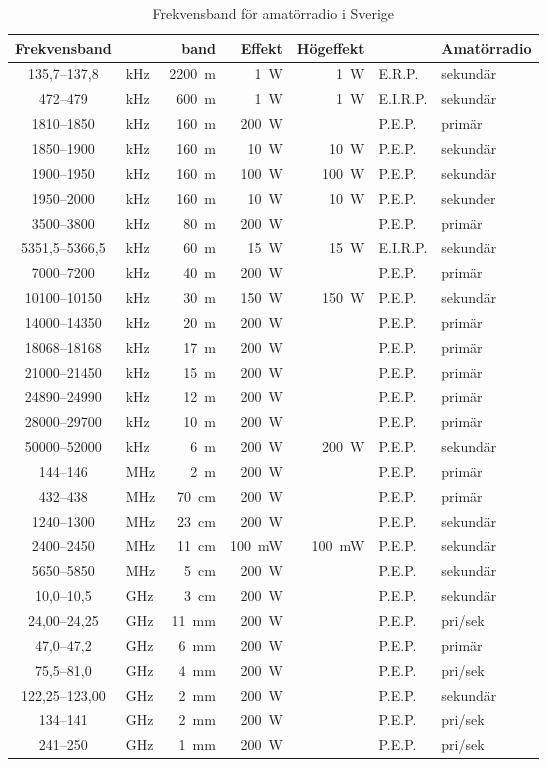 \begin{table*}[b!]
  \centering
\caption{Frekvensband för amatörradio i Sverige}
\label{frekvensplan}
\begin{tabular}{clr|rrl|l}
Frekvensband &  & band & Effekt & Högeffekt & & Amatörradio\\ \hline
135,7--137,8 & kHz & 2200~m & 1~W & 1~W & E.R.P. & sekundär\\
472--479 & kHz & 600~m & 1~W & 1~W & E.I.R.P. & sekundär\\
1810--1850 & kHz & 160~m & 200~W & & P.E.P. & primär\\
1850--1900 & kHz & 160~m & 10~W & 10~W & P.E.P. & sekundär\\
1900--1950 & kHz & 160~m & 100~W & 100~W & P.E.P. & sekundär\\
1950--2000 & kHz & 160~m & 10~W & 10~W & P.E.P. & sekunder\\
3500--3800 & kHz & 80~m  & 200~W & & P.E.P. & primär\\
5351,5--5366,5 & kHz & 60~m & 15~W & 15~W & E.I.R.P. & sekundär\\
7000--7200 & kHz & 40~m  & 200~W & & P.E.P. & primär\\
10100--10150 & kHz & 30~m & 150~W & 150~W & P.E.P. & sekundär\\
14000--14350 & kHz & 20~m & 200~W & & P.E.P. & primär\\
18068--18168 & kHz & 17~m & 200~W & & P.E.P. & primär\\
21000--21450 & kHz & 15~m & 200~W & & P.E.P. & primär\\
24890--24990 & kHz & 12~m & 200~W & & P.E.P. & primär\\
28000--29700 & kHz & 10~m & 200~W & & P.E.P. & primär\\
50000--52000 & kHz & 6~m & 200~W & 200~W & P.E.P. & sekundär\\ \hline
144--146 & MHz & 2~m & 200~W & & P.E.P. & primär\\
432--438 & MHz & 70~cm & 200~W & & P.E.P. & primär\\
1240--1300 & MHz & 23~cm & 200~W & & P.E.P. & sekundär\\
2400--2450 & MHz & 11~cm & 100~mW & 100~mW & P.E.P. & sekundär\\
5650--5850 & MHz & 5~cm & 200~W & & P.E.P. & sekundär\\
10,0--10,5 & GHz & 3~cm & 200~W & & P.E.P. & sekundär\\
24,00--24,25 & GHz & 11~mm & 200~W & & P.E.P. & pri/sek\\
47,0--47,2 & GHz & 6~mm & 200~W & & P.E.P. & primär\\
75,5--81,0 & GHz & 4~mm & 200~W & & P.E.P. & pri/sek\\
122,25--123,00 & GHz & 2~mm & 200~W & & P.E.P. & sekundär\\
134--141 & GHz & 2~mm & 200~W & & P.E.P. & pri/sek\\
241--250 & GHz & 1~mm & 200~W & & P.E.P. & pri/sek\\
\end{tabular}
\end{table*}
